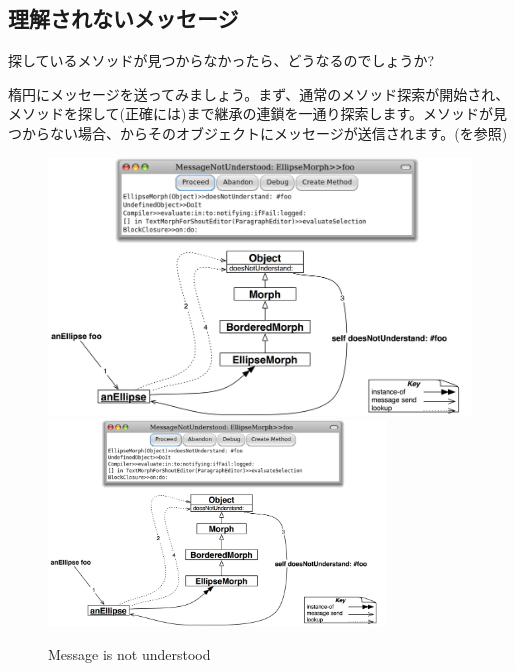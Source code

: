 \documentclass[a4paper,10pt,twoside]{book}
\begin{document}
{%
\subsection{理解されないメッセージ}

探しているメソッドが見つからなかったら、どうなるのでしょうか?

楕円にメッセージを送ってみましょう。まず、通常のメソッド探索が開始され、メソッドを探して(正確には)まで継承の連鎖を一通り探索します。メソッドが見つからない場合、からそのオブジェクトにメッセージが送信されます。(を参照)

\begin{figure}[htb]
\begin{center}
\ifluluelse
	{\includegraphics[width=\textwidth]{fooNotFound}}
	{\includegraphics[width=0.8\textwidth]{fooNotFound}}
\caption{Message  is not understood}
\end{center}
\end{figure}

}
\end{document}
